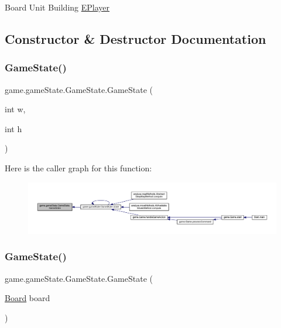 Board  Unit  Building  \mbox{\hyperlink{enumgame_1_1_e_player}{E\+Player}} 

\subsection{Constructor \& Destructor Documentation}
\mbox{\label{classgame_1_1game_state_1_1_game_state_a2af3edd7bad5467700803bcad2e17c43}} 
\subsubsection{\texorpdfstring{Game\+State()}{GameState()}\hspace{0.1cm}{\footnotesize\ttfamily [1/2]}}
{\footnotesize\ttfamily game.\+game\+State.\+Game\+State.\+Game\+State (\begin{DoxyParamCaption}\item[{int}]{w,  }\item[{int}]{h }\end{DoxyParamCaption})\hspace{0.3cm}{\ttfamily [inline]}}

Here is the caller graph for this function\+:
\nopagebreak
\begin{figure}[H]
\begin{center}
\leavevmode
\includegraphics[width=350pt]{classgame_1_1game_state_1_1_game_state_a2af3edd7bad5467700803bcad2e17c43_icgraph}
\end{center}
\end{figure}
\mbox{\label{classgame_1_1game_state_1_1_game_state_ae248b3c15e5355261423c9f6a443bcd3}} 
\subsubsection{\texorpdfstring{Game\+State()}{GameState()}\hspace{0.1cm}{\footnotesize\ttfamily [2/2]}}
{\footnotesize\ttfamily game.\+game\+State.\+Game\+State.\+Game\+State (\begin{DoxyParamCaption}\item[{\mbox{\hyperlink{classgame_1_1board_1_1_board}{Board}}}]{board }\end{DoxyParamCaption})\hspace{0.3cm}{\ttfamily [inline]}}



